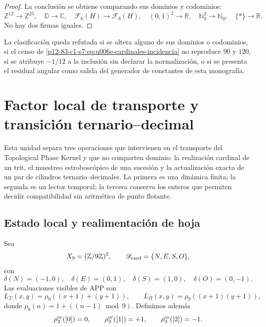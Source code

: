 {\begin{proof}
La conclusión se obtiene comparando sus dominios y codominios:
\[
 \mathbb Z^{12}\to\mathbb Z^{25},\quad
 \mathbb D\to\mathbb C,\quad
 \mathcal F_6(H)\to\mathcal F_8(H),\quad
 (0,1)^2\to\mathbb R,\quad
 \mathbb N_0^2\to\mathbb N_0,\quad
 \{\ast\}\to\mathbb R.
\]
No hay dos firmas iguales.
\end{proof}

\begin{criterion}
\label{p12-83-c1-s7:crit:u006e-refutacion}
La clasificación queda refutada si se altera alguno de sus dominios o
codominios, si el censo de
\eqref{p12-83-c1-s7:eq:u006e-cardinales-incidencia} no reproduce \(90\) y \(120\), si
se atribuye \(-1/12\) a la inclusión sin declarar la normalización, o si
se presenta el residual angular como salida del generador de constantes de
esta monografía.
\end{criterion}



\section{Factor local de transporte y transición ternario--decimal}
\label{p12-83-c1-s8:chap:tpk-factor-local-transicion-cilindros}

Esta unidad separa tres operaciones que intervienen en el transporte del
Topological Phase Kernel y que no comparten dominio: la realización cardinal
de un trit, el muestreo estroboscópico de una sucesión y la actualización
exacta de un par de cilindros ternario--decimales. La primera es una dinámica
finita; la segunda es un lector temporal; la tercera conserva los enteros
que permiten decidir compatibilidad sin aritmética de punto flotante.

\subsection{Estado local y realimentación de hoja}

Sea
\[
 X_9=(\mathbb Z/9\mathbb Z)^2,
 \qquad
 \mathscr D_{\rm card}=\{N,E,S,O\},
\]
con
\[
 \delta(N)=(-1,0),\quad \delta(E)=(0,1),\quad
 \delta(S)=(1,0),\quad \delta(O)=(0,-1).
\]
Las evaluaciones visibles de APP son
\[
 L_\Sigma(x,y)=\rho_9((x+1)+(y+1)),
 \qquad
 L_\Pi(x,y)=\rho_9((x+1)(y+1)),
\]
donde \(\rho_9(n)=1+((n-1)\bmod9)\). Definimos además
\[
 \rho_3^{\rm or}([0])=0,
 \qquad
 \rho_3^{\rm or}([1])=+1,
 \qquad
 \rho_3^{\rm or}([2])=-1.
\]

}
